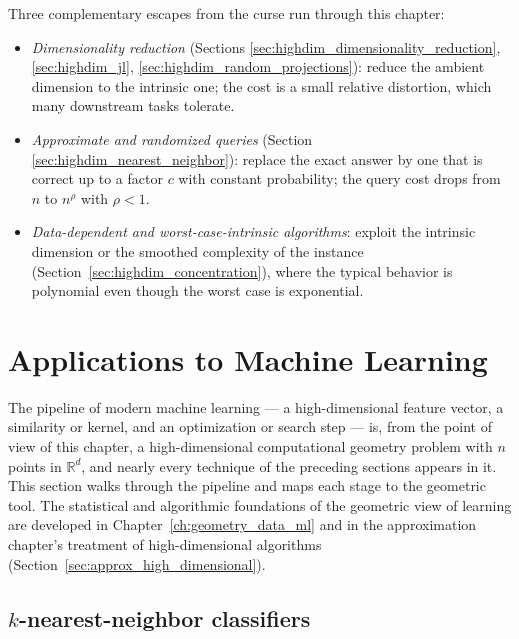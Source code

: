 Three complementary escapes from the curse run through this chapter:
\begin{itemize}
\item \emph{Dimensionality reduction} (Sections
\ref{sec:highdim_dimensionality_reduction}, \ref{sec:highdim_jl},
\ref{sec:highdim_random_projections}): reduce the ambient dimension to the
intrinsic one; the cost is a small relative distortion, which many downstream
tasks tolerate.
\item \emph{Approximate and randomized queries} (Section
\ref{sec:highdim_nearest_neighbor}): replace the exact answer by one that is
correct up to a factor $c$ with constant probability; the query cost drops from
$n$ to $n^{\rho}$ with $\rho < 1$.
\item \emph{Data-dependent and worst-case-intrinsic algorithms}: exploit the
intrinsic dimension or the 
smoothed complexity of the instance
(Section~\ref{sec:highdim_concentration}), where the typical behavior is
polynomial even though the worst case is exponential.
\end{itemize}

\section{Applications to Machine Learning}
\label{sec:highdim_ml}

The pipeline of modern machine learning --- a high-dimensional feature vector,
a similarity or kernel, and an optimization or search step --- is, from the
point of view of this chapter, a high-dimensional computational geometry
problem with $n$ points in $\mathbb{R}^d$, and nearly every technique of the
preceding sections appears in it. This section walks through the pipeline and
maps each stage to the geometric tool. The statistical and algorithmic
foundations of the geometric view of learning are developed in
Chapter~\ref{ch:geometry_data_ml} and in the approximation chapter's
treatment of high-dimensional algorithms
(Section~\ref{sec:approx_high_dimensional}).

\subsection{$k$-nearest-neighbor classifiers}

